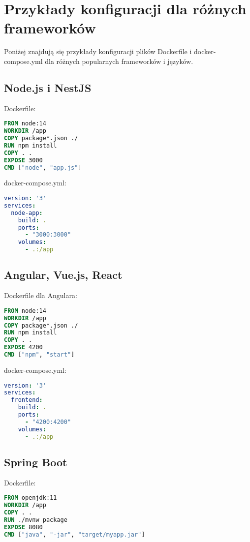 \documentclass[a4paper,12pt]{article}
\begin{document}
\section{Przykłady konfiguracji dla różnych frameworków}

Poniżej znajdują się przykłady konfiguracji plików Dockerfile i docker-compose.yml dla różnych popularnych frameworków i języków.

\subsection{Node.js i NestJS}

Dockerfile:
\begin{lstlisting}[language=Dockerfile]
FROM node:14
WORKDIR /app
COPY package*.json ./
RUN npm install
COPY . .
EXPOSE 3000
CMD ["node", "app.js"]
\end{lstlisting}

docker-compose.yml:
\begin{lstlisting}[language=yaml]
version: '3'
services:
  node-app:
    build: .
    ports:
      - "3000:3000"
    volumes:
      - .:/app
\end{lstlisting}

\subsection{Angular, Vue.js, React}

Dockerfile dla Angulara:
\begin{lstlisting}[language=Dockerfile]
FROM node:14
WORKDIR /app
COPY package*.json ./
RUN npm install
COPY . .
EXPOSE 4200
CMD ["npm", "start"]
\end{lstlisting}

docker-compose.yml:
\begin{lstlisting}[language=yaml]
version: '3'
services:
  frontend:
    build: .
    ports:
      - "4200:4200"
    volumes:
      - .:/app
\end{lstlisting}

\subsection{Spring Boot}

Dockerfile:
\begin{lstlisting}[language=Dockerfile]
FROM openjdk:11
WORKDIR /app
COPY . .
RUN ./mvnw package
EXPOSE 8080
CMD ["java", "-jar", "target/myapp.jar"]
\end{lstlisting}
\end{document}
